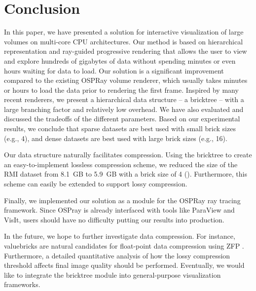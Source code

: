 \section{Conclusion}
In this paper, we have presented a solution for interactive visualization of 
large volumes on multi-core CPU architectures. Our method is based on  
hierarchical representation and ray-guided progressive rendering that 
allows the user to view and explore hundreds of gigabytes of data without
spending minutes or even hours waiting for data to load. 
Our solution is a significant improvement compared to the existing OSPRay volume renderer,
which usually takes minutes or hours to load the data prior to rendering the first frame. 
Inspired by many recent renderers, we present a hierarchical data structure
-- a bricktree -- with a large branching factor and relatively low overhead. We have
also evaluated and discussed the tradeoffs of the different 
parameters. Based on our experimental results, we conclude that sparse datasets 
are best used with small brick sizes (e.g., 4), and dense datasets are best used with 
large brick sizes (e.g., 16). 

Our data structure naturally facilitates compression. Using the bricktree to create an easy-to-implement lossless compression scheme, we reduced the size of the RMI dataset from 8.1~GB to 5.9~GB with a brick size of 4 
(). Furthermore, this scheme can easily be extended to support lossy compression.

Finally, we implemented our solution as a module for the OSPRay ray tracing framework. Since OSPray is already interfaced with tools like ParaView and VisIt, users should have no difficulty putting our results into production.


In the future, we hope to further investigate data compression.  
For instance, valuebricks are natural candidates for float-point data compression using ZFP
\cite{lindstrom2014fixed}.
Furthermore, a detailed quantitative analysis of how the lossy compression
threshold affects final image quality should be performed. 
Eventually, we would like to integrate the bricktree module into
general-purpose visualization frameworks. 





%

%
%
%




